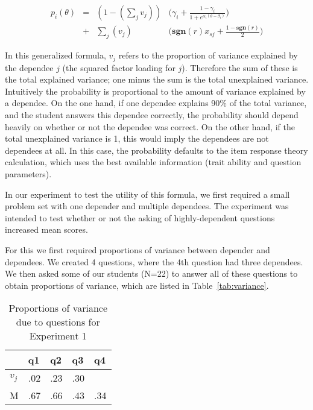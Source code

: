 \begin{align*}
  p_i(\theta) &=& (1- (\displaystyle\sum_j v_j)) & \Big(\gamma_i + \frac{1-\gamma_i}{1+e^{\alpha_i(\theta-\beta_i)}}\Big) \\
              &+& \displaystyle\sum_j (v_j)   & \Big(\mathbf{sgn}(r)x_{sj}+\frac{1-\mathbf{sgn}(r)}{2}\Big)
\end{align*}

In this generalized formula, $v_j$ refers to the proportion of variance
explained by the dependee $j$ (the squared factor loading for $j$).  Therefore
the sum of these is the total explained variance; one minus the sum is the
total unexplained variance.  Intuitively the probability is proportional to the
amount of variance explained by a dependee.  On the one hand, if one dependee
explains 90\% of the total variance, and the student answers this dependee
correctly, the probability should depend heavily on whether or not the dependee
was correct.  On the other hand, if the total unexplained variance is 1, this
would imply the dependees are not dependees at all.  In this case, the
probability defaults to the item response theory calculation, which uses the
best available information (trait ability and question parameters).

In our experiment to test the utility of this formula, we first required a
small problem set with one depender and multiple dependees.  The experiment
was intended to test whether or not the asking of highly-dependent questions
increased mean scores.

For this we first required proportions of variance between depender and
dependees.  We created 4 questions, where the 4th question had three dependees.
We then asked some of our students (N=22) to answer all of these questions to
obtain proportions of variance, which are listed in Table~\ref{tab:variance}.  

\begin{table}
\begin{center}
\label{tab:variances}
\caption{Proportions of variance due to questions for Experiment 1}
\vspace{12pt}
\begin{tabularx}{\textwidth}{|X|X|X|X|X|}
                                  \hline
      &\y q1 &\y q2 &\y  q3 &\y q4  \\ \hline
\y $v_j$ &  .02 & .23 & .30 &     \\ \hline
\y M    &  .67 & .66 & .43 & .34 \\ \hline
\end{tabularx}
\vspace{24pt}
\end{center}
\end{table}

